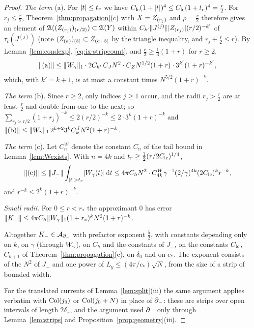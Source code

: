 \begin{proof}
\emph{The term} (a). For $\lvert t\rvert\le t_r$ we have $C_{\rm lc}(1+\lvert t\rvert)^4\le C_{\rm lc}(1+t_r)^4=\frac r2$. For $r_j\le\frac r2$,
Theorem~\ref{thm:propagation}(c) with $X=Z_{(r_j)}$ and $\rho=\frac r2$ therefore gives an element of
$\mathfrak{A}((Z_{(r_j)})_{(r/2)})\subset\mathfrak{A}(Y)$ within $C_{k'}\lVert J^{(j)}\rVert\lvert Z_{(r_j)}\rvert(r/2)^{-k'}$ of $\tau_t(J^{(j)})$
(note $(Z_{(a)})_{(b)}\subset Z_{(a+b)}$ by the triangle inequality, and $r_j+\frac r2\le r$). By
Lemma~\ref{lem:condexp}, \eqref{eq:ix-stripcount}, and $\frac r2\ge\frac13(1+r)$ for $r\ge2$,
\[
\lVert\mathrm{(a)}\rVert\le\lVert W_{\gamma}\rVert_1\cdot2C_{k'}\,C_JN^2\cdot C_ZN^{1/2}(1+r)\cdot3^{k'}(1+r)^{-k'} ,
\]
which, with $k'=k+1$, is at most a constant times $N^{5/2}(1+r)^{-k}$.

\emph{The term} (b). Since $r\ge2$, only indices $j\ge1$ occur, and the radii $r_j>\frac r2$ are at least $\frac r2$ and
double from one to the next; so $\sum_{r_j>r/2}(1+r_j)^{-k}\le2(r/2)^{-k}\le2\cdot3^k(1+r)^{-k}$ and
$\lVert\mathrm{(b)}\rVert\le\lVert W_{\gamma}\rVert_1\,2^{k+2}3^kC^J_kN^2(1+r)^{-k}$.

\emph{The term} (c). Let $C^W_n$ denote the constant $C_n$ of the tail bound in Lemma~\ref{lem:Wexists}. With $n=4k$
and $t_r\ge\frac12(r/2C_{\rm lc})^{1/4}$,
\[
\lVert\mathrm{(c)}\rVert\le\lVert J_-\rVert\int_{\lvert t\rvert>t_r}\lvert W_{\gamma}(t)\rvert\,\mathrm{d} t\le4\pi C_hN^2\cdot C^W_{4k}\gamma^{-1}(2/\gamma)^{4k}(2C_{\rm lc})^kr^{-k},
\]
and $r^{-k}\le2^k(1+r)^{-k}$.

\emph{Small radii.} For $0\le r<r_*$ the approximant $0$ has error
$\lVert K_-\rVert\le4\pi C_h\lVert W_{\gamma}\rVert_1(1+r_*)^kN^2(1+r)^{-k}$.

Altogether $K_-\in\mathcal{A}_{\partial_{-}}$ with prefactor exponent $\frac52$, with constants depending only on $k$, on $\gamma$
(through $W_{\gamma}$), on $C_h$ and the constants of $J_-$, on the constants $C_{\rm lc}$, $C_{k+1}$ of
Theorem~\ref{thm:propagation}(c), on $\delta_0$ and on $c_*$. The exponent consists of the $N^2$ of $J_-$ and one power of
$L_y\le(4\pi/c_*)\sqrt N$, from the size of a strip of bounded width.

For the translated currents of Lemma~\ref{lem:split}(iii) the same argument applies verbatim with $\mathrm{Col}(j_0)$ or
$\mathrm{Col}(j_0+N)$ in place of $\partial_{-}$: these are strips over open intervals of length $2\delta_x$, and the argument used
$\partial_{-}$ only through Lemma~\ref{lem:strips} and Proposition~\ref{prop:geometry}(iii).
\end{proof}

